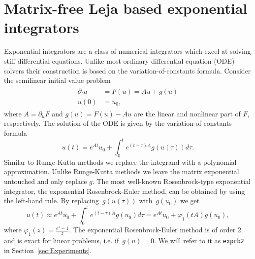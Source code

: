 \documentclass{scrartcl}
\begin{document}
\section{Matrix-free Leja based exponential integrators} \label{sec:expint}
	Exponential integrators are a class of numerical integrators which excel at solving stiff differential equations. Unlike most ordinary differential equation (ODE) solvers their construction is based on the variation-of-constants formula. Consider the semilinear initial value problem
	\begin{align}
	\begin{split}
	\partial_tu &= F(u) = Au + g(u) \\ 
	u(0) &= u_0,
	\end{split}\label{semilinear}
	\end{align}
	where $A = \partial_uF$ and $g(u) = F(u)-Au$ are the linear and nonlinear part of $F$, respectively. The solution of the ODE is given by the variation-of-constants formula
	\[
	u(t) = e^{At}u_0 + \int_{0}^{t}e^{(t-\tau)A}g(u(\tau))d\tau.
	\]
	Similar to Runge-Kutta methods we replace the integrand with a polynomial approximation. Unlike Runge-Kutta methods we leave the matrix exponential untouched and only replace $g$. The most well-known Rosenbrock-type exponential integrator, the exponential Rosenbrock-Euler method, can be obtained by using the left-hand rule. By replacing~$g(u(\tau))$ with~$g(u_0)$ we get
	\[
	u(t) \approx e^{At}u_0 + \int_{0}^{t}e^{(t-\tau)A}g(u_0)d\tau = e^{At}u_0 + \varphi_1(tA)g(u_0),
	\]
	where $\varphi_1(z) = \frac{e^z-1}z$. The exponential Rosenbrock-Euler method is of order 2 and is exact for linear problems, i.e. if~$g(u)=0$. We will refer to it as \texttt{exprb2} in Section~\ref{sec:Experiments}.
\end{document}
